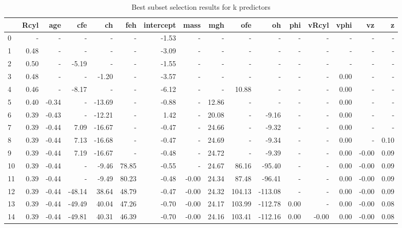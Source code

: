 \begin{table}[h!]
\caption{Best subset selection results for k predictors}
\label{tab:BestSubset}
\begin{tabular}{lrrrrrrrrrrrrrrr}
\toprule
 & Rcyl & age & cfe & ch & feh & intercept & mass & mgh & ofe & oh & phi & vRcyl & vphi & vz & z \\
\midrule
0 & - & - & - & - & - & -1.53 & - & - & - & - & - & - & - & - & - \\
1 & 0.48 & - & - & - & - & -3.09 & - & - & - & - & - & - & - & - & - \\
2 & 0.50 & - & -5.19 & - & - & -1.55 & - & - & - & - & - & - & - & - & - \\
3 & 0.48 & - & - & -1.20 & - & -3.57 & - & - & - & - & - & - & 0.00 & - & - \\
4 & 0.46 & - & -8.17 & - & - & -6.12 & - & - & 10.88 & - & - & - & 0.00 & - & - \\
5 & 0.40 & -0.34 & - & -13.69 & - & -0.88 & - & 12.86 & - & - & - & - & 0.00 & - & - \\
6 & 0.39 & -0.43 & - & -12.21 & - & 1.42 & - & 20.08 & - & -9.16 & - & - & 0.00 & - & - \\
7 & 0.39 & -0.44 & 7.09 & -16.67 & - & -0.47 & - & 24.66 & - & -9.32 & - & - & 0.00 & - & - \\
8 & 0.39 & -0.44 & 7.13 & -16.68 & - & -0.47 & - & 24.69 & - & -9.34 & - & - & 0.00 & - & 0.10 \\
9 & 0.39 & -0.44 & 7.19 & -16.67 & - & -0.48 & - & 24.72 & - & -9.39 & - & - & 0.00 & -0.00 & 0.09 \\
10 & 0.39 & -0.44 & - & -9.46 & 78.85 & -0.55 & - & 24.67 & 86.16 & -95.40 & - & - & 0.00 & -0.00 & 0.09 \\
11 & 0.39 & -0.44 & - & -9.49 & 80.23 & -0.48 & -0.00 & 24.34 & 87.48 & -96.41 & - & - & 0.00 & -0.00 & 0.09 \\
12 & 0.39 & -0.44 & -48.14 & 38.64 & 48.79 & -0.47 & -0.00 & 24.32 & 104.13 & -113.08 & - & - & 0.00 & -0.00 & 0.09 \\
13 & 0.39 & -0.44 & -49.49 & 40.04 & 47.26 & -0.70 & -0.00 & 24.17 & 103.99 & -112.78 & 0.00 & - & 0.00 & -0.00 & 0.08 \\
14 & 0.39 & -0.44 & -49.81 & 40.31 & 46.39 & -0.70 & -0.00 & 24.16 & 103.41 & -112.16 & 0.00 & -0.00 & 0.00 & -0.00 & 0.08 \\
\bottomrule
\end{tabular}
\end{table}

